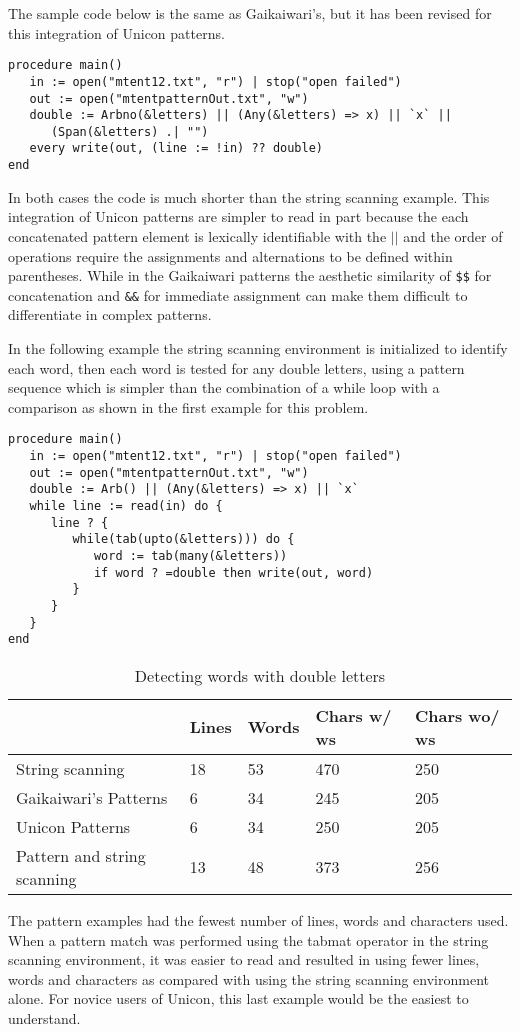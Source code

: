 \documentclass{article}
\begin{document}
The sample code below is the same as Gaikaiwari's, but it has been revised for this integration of Unicon patterns.
\begin{verbatim}
procedure main()
   in := open("mtent12.txt", "r") | stop("open failed")
   out := open("mtentpatternOut.txt", "w")
   double := Arbno(&letters) || (Any(&letters) => x) || `x` ||
      (Span(&letters) .| "")
   every write(out, (line := !in) ?? double)
end 
\end{verbatim}
In both cases the code is much shorter than the string scanning example.  This integration of Unicon patterns are simpler to read in part because the each concatenated pattern element is lexically identifiable with the \texttt{$||$} and the order of operations require the assignments and alternations to be defined within parentheses.  While in the Gaikaiwari patterns the aesthetic similarity of \texttt{\$\$} for concatenation and \texttt{\&\&} for immediate assignment can make them difficult to differentiate in complex patterns. 

In the following example the string scanning environment is initialized to identify each word, then each word is tested for any double letters, using a pattern sequence which is simpler than the combination of a while loop with a comparison as shown in the first example for this problem.
\begin{verbatim}
procedure main()
   in := open("mtent12.txt", "r") | stop("open failed")
   out := open("mtentpatternOut.txt", "w")
   double := Arb() || (Any(&letters) => x) || `x`
   while line := read(in) do {
      line ? {
         while(tab(upto(&letters))) do {
            word := tab(many(&letters))
            if word ? =double then write(out, word)
         }
      }
   }
end 
\end{verbatim}


\begin{table}[ht]
	\caption{Detecting words with double letters}
	\centering
	\begin{tabular}{|l|l|l|l|l|}
		\hline\hline
		 & Lines & Words & Chars w/ ws & Chars wo/ ws\\
		\hline
		String scanning & 18 & 53 & 470 & 250 \\
		Gaikaiwari's Patterns & 6 & 34 & 245 & 205 \\
		Unicon Patterns & 6 & 34 & 250 & 205 \\
		Pattern and string scanning & 13 & 48 & 373 & 256 \\
		\hline
	\end{tabular}
\end{table}
The pattern examples had the fewest number of lines, words and characters used.  When a pattern match was performed using the tabmat operator in the string scanning environment, it was easier to read and resulted in using fewer lines, words and characters as compared with using the string scanning environment alone.  For novice users of Unicon, this last example would be the easiest to understand.
\end{document}
